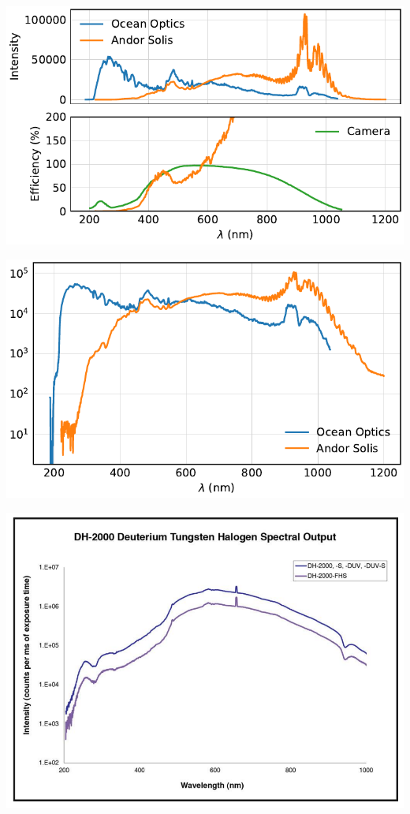 \begin{frame}
	\centering
	\includegraphics{../analysis/figures/efficiency.pdf}
\end{frame}

\begin{frame}
	\centering
	\includegraphics{../analysis/figures/efficiency_spectrum.pdf}
\end{frame}

\begin{frame}
	\centering
	\includegraphics[width=.8\textwidth]{./figures/dh-2000.png}
\end{frame}